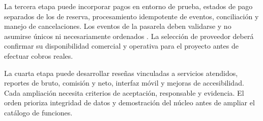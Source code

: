 La tercera etapa puede incorporar pagos en entorno de prueba, estados de pago separados de los de reserva, procesamiento idempotente de eventos, conciliación y manejo de cancelaciones. Los eventos de la pasarela deben validarse y no asumirse únicos ni necesariamente ordenados \cite{ref18}. La selección de proveedor deberá confirmar su disponibilidad comercial y operativa para el proyecto antes de efectuar cobros reales.

La cuarta etapa puede desarrollar reseñas vinculadas a servicios atendidos, reportes de bruto, comisión y neto, interfaz móvil y mejoras de accesibilidad. Cada ampliación necesita criterios de aceptación, responsable y evidencia. El orden prioriza integridad de datos y demostración del núcleo antes de ampliar el catálogo de funciones.
